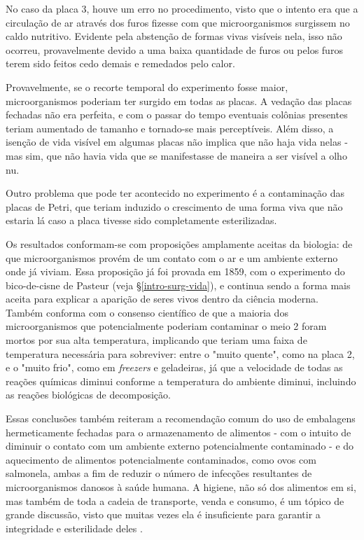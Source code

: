 \documentclass[12pt, titlepage]{article}
\begin{document}
No caso da placa 3, houve um erro no procedimento, visto que o intento era que a circulação de ar através dos furos fizesse com que microorganismos surgissem no caldo nutritivo. Evidente pela abstenção de formas vivas visíveis nela, isso não ocorreu, provavelmente devido a uma baixa quantidade de furos ou pelos furos terem sido feitos cedo demais e remedados pelo calor.

Provavelmente, se o recorte temporal do experimento fosse maior, microorganismos poderiam ter surgido em todas as placas. A vedação das placas fechadas não era perfeita, e com o passar do tempo eventuais colônias presentes teriam aumentado de tamanho e tornado-se mais perceptíveis. Além disso, a isenção de vida visível em algumas placas não implica que não haja vida nelas - mas sim, que não havia vida que se manifestasse de maneira a ser visível a olho nu.

Outro problema que pode ter acontecido no experimento é a contaminação das placas de Petri, que teriam induzido o crescimento de uma forma viva que não estaria lá caso a placa tivesse sido completamente esterilizadas.

Os resultados conformam-se com proposições amplamente aceitas da biologia: de que microorganismos provém de um contato com o ar e um ambiente externo onde já viviam. Essa proposição já foi provada em 1859, com o experimento do bico-de-cisne de Pasteur (veja \S\ref{intro-surg-vida}), e continua sendo a forma mais aceita para explicar a aparição de seres vivos dentro da ciência moderna. Também conforma com o consenso científico de que a maioria dos microorganismos que potencialmente poderiam contaminar o meio 2 foram mortos por sua alta temperatura, implicando que teriam uma faixa de temperatura necessária para sobreviver: entre o "muito quente", como na placa 2, e o "muito frio", como em \textit{freezers} e geladeiras, já que a velocidade de todas as reações químicas diminui conforme a temperatura do ambiente diminui, incluindo as reações biológicas de decomposição.

Essas conclusões também reiteram a recomendação comum do uso de embalagens hermeticamente fechadas para o armazenamento de alimentos - com o intuito de diminuir o contato com um ambiente externo potencialmente contaminado - e do aquecimento de alimentos potencialmente contaminados, como ovos com salmonela, ambas a fim de reduzir o número de infecções resultantes de microorganismos danosos à saúde humana. A higiene, não só dos alimentos em si, mas também de toda a cadeia de transporte, venda e consumo, é um tópico de grande discussão, visto que muitas vezes ela é insuficiente para garantir a integridade e esterilidade deles \cite{coelho_milagres_martins_azeredo_santana_2010, balbani2001contaminaccao}.
\end{document}
